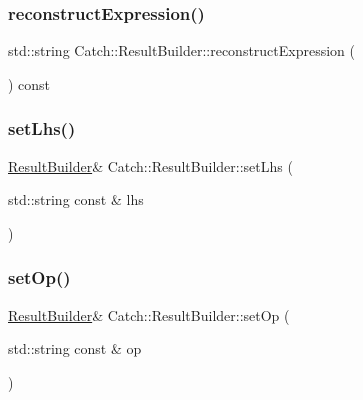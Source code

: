\hypertarget{class_catch_1_1_result_builder_aebe098f8d206a89995076b95a3348195}{}\label{class_catch_1_1_result_builder_aebe098f8d206a89995076b95a3348195} 
\subsubsection{\texorpdfstring{reconstruct\+Expression()}{reconstructExpression()}}
{\footnotesize\ttfamily std\+::string Catch\+::\+Result\+Builder\+::reconstruct\+Expression (\begin{DoxyParamCaption}{ }\end{DoxyParamCaption}) const}

\hypertarget{class_catch_1_1_result_builder_a5de584deec90fc6b7cc5bcf9eb636442}{}\label{class_catch_1_1_result_builder_a5de584deec90fc6b7cc5bcf9eb636442} 
\subsubsection{\texorpdfstring{set\+Lhs()}{setLhs()}}
{\footnotesize\ttfamily \hyperlink{class_catch_1_1_result_builder}{Result\+Builder}\& Catch\+::\+Result\+Builder\+::set\+Lhs (\begin{DoxyParamCaption}\item[{std\+::string const \&}]{lhs }\end{DoxyParamCaption})}

\hypertarget{class_catch_1_1_result_builder_a8232ed051ed7f6adfbc152c98aa1dc0c}{}\label{class_catch_1_1_result_builder_a8232ed051ed7f6adfbc152c98aa1dc0c} 
\subsubsection{\texorpdfstring{set\+Op()}{setOp()}}
{\footnotesize\ttfamily \hyperlink{class_catch_1_1_result_builder}{Result\+Builder}\& Catch\+::\+Result\+Builder\+::set\+Op (\begin{DoxyParamCaption}\item[{std\+::string const \&}]{op }\end{DoxyParamCaption})}

